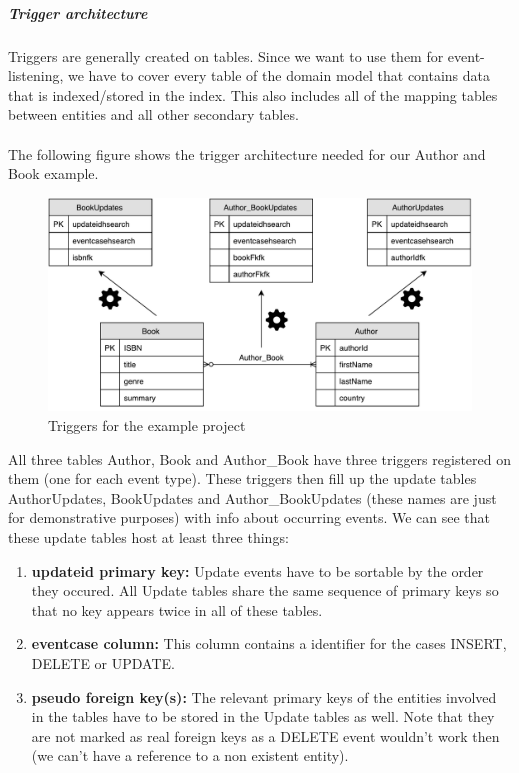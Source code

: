 \subparagraph{Trigger architecture}

Triggers are generally created on tables. Since we want to use them for event-listening, we have to cover every table of the domain model that contains data that is indexed/stored in the index. This also includes all of the mapping tables between entities and all other secondary tables.
\\\\
The following figure shows the trigger architecture needed for our Author and Book example.

\pagebreak

\begin{figure}[ht]
	\centering
	\includegraphics[scale=0.6]{images/Triggers_Schema.pdf}
	\caption{Triggers for the example project}
	\label{triggers_schema}
\end{figure}
\noindent
All three tables Author, Book and Author\_Book have three triggers registered on them (one for each event type). These triggers then fill up the update tables AuthorUpdates, BookUpdates and Author\_BookUpdates (these names are just for demonstrative purposes) with info about occurring events. We can see that these update tables host at least three things:

\begin{enumerate}
	\item \textbf{updateid primary key:} Update events have to be sortable by the order they occured. All Update tables share the same sequence of primary keys so that no key appears twice in all of these tables.
	\item \textbf{eventcase column:} This column contains a identifier for the cases INSERT, DELETE or UPDATE.
	\item \textbf{pseudo foreign key(s):} The relevant primary keys of the entities involved in the tables have to be stored in the Update tables as well. Note that they are not marked as real foreign keys as a DELETE event wouldn't work then (we can't have a reference to a non existent entity).
\end{enumerate}

